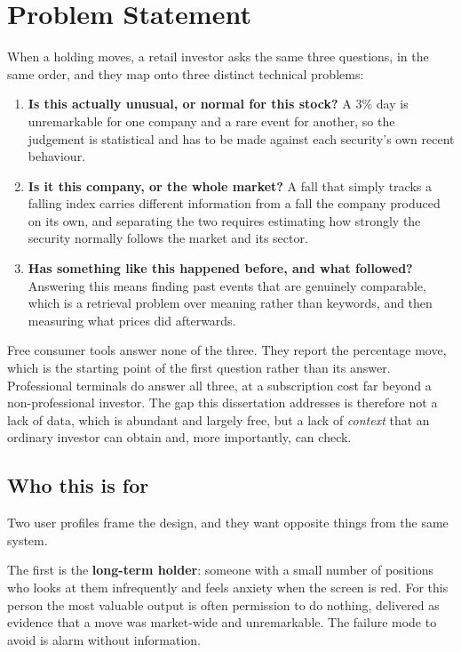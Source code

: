 \section{Problem Statement}
\label{sec:intro_problem}

When a holding moves, a retail investor asks the same three questions, in the same order, and
they map onto three distinct technical problems:

\begin{enumerate}
  \item \textbf{Is this actually unusual, or normal for this stock?} A 3\% day is unremarkable for
        one company and a rare event for another, so the judgement is statistical and has to be made
        against each security's own recent behaviour.
  \item \textbf{Is it this company, or the whole market?} A fall that simply tracks a falling index
        carries different information from a fall the company produced on its own, and separating
        the two requires estimating how strongly the security normally follows the market and its
        sector.
  \item \textbf{Has something like this happened before, and what followed?} Answering this means
        finding past events that are genuinely comparable, which is a retrieval problem over
        meaning rather than keywords, and then measuring what prices did afterwards.
\end{enumerate}

Free consumer tools answer none of the three. They report the percentage move, which is the
starting point of the first question rather than its answer. Professional terminals do answer all
three, at a subscription cost far beyond a non-professional investor. The gap this dissertation
addresses is therefore not a lack of data, which is abundant and largely free, but a lack of
\emph{context} that an ordinary investor can obtain and, more importantly, can check.

\subsection*{Who this is for}

Two user profiles frame the design, and they want opposite things from the same system.

The first is the \textbf{long-term holder}: someone with a small number of positions who looks at
them infrequently and feels anxiety when the screen is red. For this person the most valuable
output is often permission to do nothing, delivered as evidence that a move was market-wide and
unremarkable. The failure mode to avoid is alarm without information.

